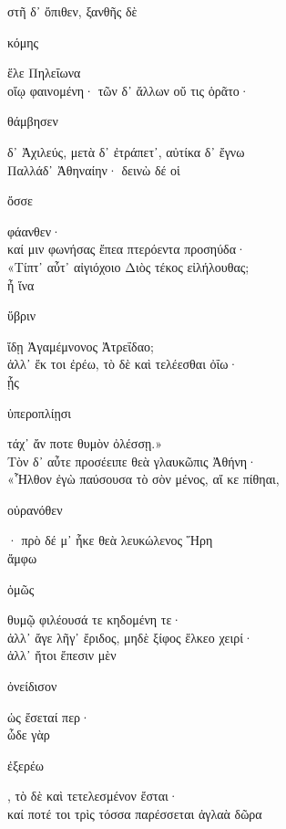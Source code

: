 \documentclass{ransom}
\begin{document}
\renewcommand{\rightheaderwhat}{\rightheaderwhatglosses}%
\begin{foreignpage}
\begin{graytext}
στῆ δ᾽ ὄπιθεν, ξανθῆς δὲ \begin{whitetext}κόμης\end{whitetext} ἕλε Πηλεΐωνα\\
οἴῳ φαινομένη· τῶν δ᾽ ἄλλων οὔ τις ὁρᾶτο·\\
\begin{whitetext}θάμβησεν\end{whitetext} δ᾽ Ἀχιλεύς, μετὰ δ᾽ ἐτράπετ᾽, αὐτίκα δ᾽ ἔγνω\\
Παλλάδ᾽ Ἀθηναίην· δεινὼ δέ οἱ \begin{whitetext}ὄσσε\end{whitetext} φάανθεν·\hfill{}\\
καί μιν φωνήσας ἔπεα πτερόεντα προσηύδα·\\
«Τίπτ᾽ αὖτ᾽ αἰγιόχοιο Διὸς τέκος εἰλήλουθας;\\
ἦ ἵνα \begin{whitetext}ὕβριν\end{whitetext} ἴδῃ Ἀγαμέμνονος Ἀτρεΐδαο;\\
ἀλλ᾽ ἔκ τοι ἐρέω, τὸ δὲ καὶ τελέεσθαι ὀΐω·\\
ᾗς \begin{whitetext}ὑπεροπλίῃσι\end{whitetext} τάχ᾽ ἄν ποτε θυμὸν ὀλέσσῃ.»\hfill{}\\
Τὸν δ᾽ αὖτε προσέειπε θεὰ γλαυκῶπις Ἀθήνη·\\
«Ἧλθον ἐγὼ παύσουσα τὸ σὸν μένος, αἴ κε πίθηαι,\\
\begin{whitetext}οὐρανόθεν\end{whitetext}· πρὸ δέ μ᾽ ἧκε θεὰ λευκώλενος Ἥρη\\
ἄμφω \begin{whitetext}ὁμῶς\end{whitetext} θυμῷ φιλέουσά τε κηδομένη τε·\\
ἀλλ᾽ ἄγε λῆγ᾽ ἔριδος, μηδὲ ξίφος ἕλκεο χειρί·\hfill{}\\
ἀλλ᾽ ἤτοι ἔπεσιν μὲν \begin{whitetext}ὀνείδισον\end{whitetext} ὡς ἔσεταί περ·\\
ὧδε γὰρ \begin{whitetext}ἐξερέω\end{whitetext}, τὸ δὲ καὶ τετελεσμένον ἔσται·\\
καί ποτέ τοι τρὶς τόσσα παρέσσεται ἀγλαὰ δῶρα\\


\end{graytext}
\end{foreignpage}
\end{document}
